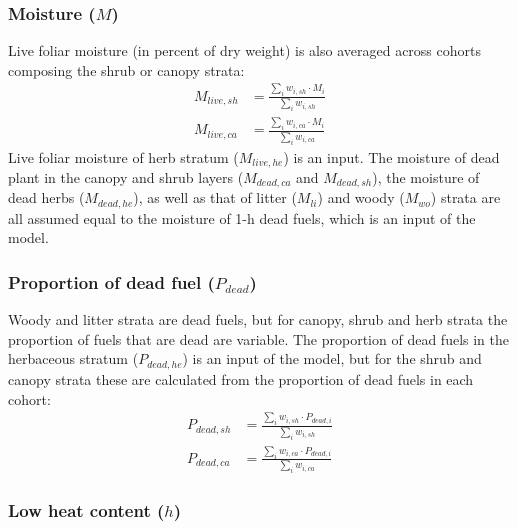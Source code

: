 \documentclass[]{book}
\begin{document}
\hypertarget{moisture-m}{%
\subsubsection{\texorpdfstring{Moisture (\(M\))}{Moisture (M)}}\label{moisture-m}}

Live foliar moisture (in percent of dry weight) is also averaged across cohorts composing the shrub or canopy strata:
\begin{eqnarray}
M_{live, sh} &= \frac{\sum_{i}{w_{i,sh} \cdot M_i}}{\sum_{i}{w_{i,sh}}} \\
M_{live, ca} &= \frac{\sum_{i}{w_{i,ca} \cdot M_i}}{\sum_{i}{w_{i,ca}}}
\end{eqnarray}
Live foliar moisture of herb stratum (\(M_{live, he}\)) is an input. The moisture of dead plant in the canopy and shrub layers (\(M_{dead, ca}\) and \(M_{dead, sh}\)), the moisture of dead herbs (\(M_{dead, he}\)), as well as that of litter (\(M_{li}\)) and woody (\(M_{wo}\)) strata are all assumed equal to the moisture of 1-h dead fuels, which is an input of the model.

\hypertarget{proportion-of-dead-fuel-p_dead}{%
\subsubsection{\texorpdfstring{Proportion of dead fuel (\(P_{dead}\))}{Proportion of dead fuel (P\_\{dead\})}}\label{proportion-of-dead-fuel-p_dead}}

Woody and litter strata are dead fuels, but for canopy, shrub and herb strata the proportion of fuels that are dead are variable. The proportion of dead fuels in the herbaceous stratum (\(P_{dead,he}\)) is an input of the model, but for the shrub and canopy strata these are calculated from the proportion of dead fuels in each cohort:
\begin{eqnarray}
P_{dead,sh} &= \frac{\sum_{i}{w_{i,sh} \cdot P_{dead,i}}}{\sum_{i}{w_{i,sh}}} \\
P_{dead, ca} &= \frac{\sum_{i}{w_{i,ca} \cdot P_{dead,i}}}{\sum_{i}{w_{i,ca}}}
\end{eqnarray}

\hypertarget{low-heat-content-h}{%
\subsubsection{\texorpdfstring{Low heat content (\(h\))}{Low heat content (h)}}\label{low-heat-content-h}}
\end{document}

